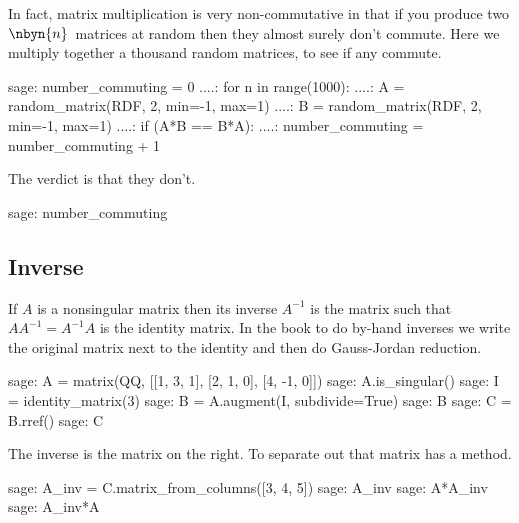 In fact, matrix multiplication is very non-commutative 
in that if you produce two $\nbyn{n}$~matrices
at random then they almost surely don't commute.
Here we multiply together a thousand random matrices, to see
if any commute.
\begin{sagecommandline}
sage: number_commuting = 0 
....: for n in range(1000):                                       
....:     A = random_matrix(RDF, 2, min=-1, max=1)
....:     B = random_matrix(RDF, 2, min=-1, max=1)
....:     if (A*B == B*A):
....:         number_commuting = number_commuting + 1 
\end{sagecommandline}
The verdict is that they don't.
\begin{sagecommandline}
sage: number_commuting
\end{sagecommandline}

 


\subsection{Inverse}
If $A$ is a nonsingular matrix then its inverse $A^{-1}$
is the matrix such that $AA^{-1}=A^{-1}A$ is the identity matrix. 
In the book to do by-hand inverses 
we write the original matrix next to the identity 
and then do Gauss-Jordan reduction.
\begin{sagecommandline}
sage: A = matrix(QQ, [[1, 3, 1], [2, 1, 0], [4, -1, 0]])
sage: A.is_singular()
sage: I = identity_matrix(3)
sage: B = A.augment(I, subdivide=True)
sage: B
sage: C = B.rref()
sage: C
\end{sagecommandline}
\noindent
The inverse is the matrix on the right.
To separate out that matrix 
\Sage{} has a  method.
\begin{sagecommandline}
sage: A_inv = C.matrix_from_columns([3, 4, 5])
sage: A_inv
sage: A*A_inv
sage: A_inv*A
\end{sagecommandline}

